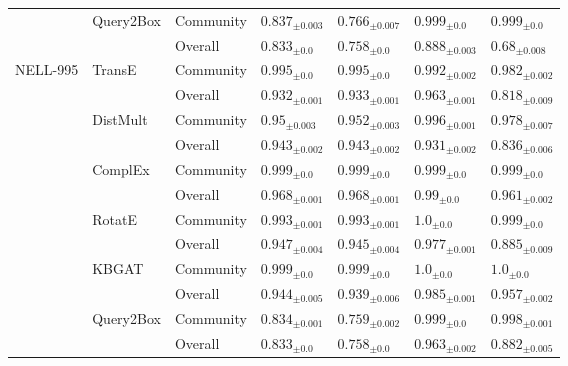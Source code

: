 \begin{table}[hb!]
\begin{adjustbox}{width=\textwidth}
\begin{tabular}{lllllll}
         & Query2Box & Community &  ${{0.837}_{\pm 0.003}}$ &  ${{0.766}_{\pm 0.007}}$ &    ${{0.999}_{\pm 0.0}}$ &    ${{0.999}_{\pm 0.0}}$ \\
         &           & Overall &    ${{0.833}_{\pm 0.0}}$ &    ${{0.758}_{\pm 0.0}}$ &  ${{0.888}_{\pm 0.003}}$ &   ${{0.68}_{\pm 0.008}}$ \\
\midrule
NELL-995 & TransE & Community &    ${{0.995}_{\pm 0.0}}$ &    ${{0.995}_{\pm 0.0}}$ &  ${{0.992}_{\pm 0.002}}$ &  ${{0.982}_{\pm 0.002}}$ \\
         &           & Overall &  ${{0.932}_{\pm 0.001}}$ &  ${{0.933}_{\pm 0.001}}$ &  ${{0.963}_{\pm 0.001}}$ &  ${{0.818}_{\pm 0.009}}$ \\
         & DistMult & Community &   ${{0.95}_{\pm 0.003}}$ &  ${{0.952}_{\pm 0.003}}$ &  ${{0.996}_{\pm 0.001}}$ &  ${{0.978}_{\pm 0.007}}$ \\
         &           & Overall &  ${{0.943}_{\pm 0.002}}$ &  ${{0.943}_{\pm 0.002}}$ &  ${{0.931}_{\pm 0.002}}$ &  ${{0.836}_{\pm 0.006}}$ \\
         & ComplEx & Community &    ${{0.999}_{\pm 0.0}}$ &    ${{0.999}_{\pm 0.0}}$ &    ${{0.999}_{\pm 0.0}}$ &    ${{0.999}_{\pm 0.0}}$ \\
         &           & Overall &  ${{0.968}_{\pm 0.001}}$ &  ${{0.968}_{\pm 0.001}}$ &     ${{0.99}_{\pm 0.0}}$ &  ${{0.961}_{\pm 0.002}}$ \\
         & RotatE & Community &  ${{0.993}_{\pm 0.001}}$ &  ${{0.993}_{\pm 0.001}}$ &      ${{1.0}_{\pm 0.0}}$ &    ${{0.999}_{\pm 0.0}}$ \\
         &           & Overall &  ${{0.947}_{\pm 0.004}}$ &  ${{0.945}_{\pm 0.004}}$ &  ${{0.977}_{\pm 0.001}}$ &  ${{0.885}_{\pm 0.009}}$ \\
         & KBGAT & Community &    ${{0.999}_{\pm 0.0}}$ &    ${{0.999}_{\pm 0.0}}$ &      ${{1.0}_{\pm 0.0}}$ &      ${{1.0}_{\pm 0.0}}$ \\
         &           & Overall &  ${{0.944}_{\pm 0.005}}$ &  ${{0.939}_{\pm 0.006}}$ &  ${{0.985}_{\pm 0.001}}$ &  ${{0.957}_{\pm 0.002}}$ \\
         & Query2Box & Community &  ${{0.834}_{\pm 0.001}}$ &  ${{0.759}_{\pm 0.002}}$ &    ${{0.999}_{\pm 0.0}}$ &  ${{0.998}_{\pm 0.001}}$ \\
         &           & Overall &    ${{0.833}_{\pm 0.0}}$ &    ${{0.758}_{\pm 0.0}}$ &  ${{0.963}_{\pm 0.002}}$ &  ${{0.882}_{\pm 0.005}}$ \\
\bottomrule
\end{tabular}
  \end{adjustbox}
\end{table}%

